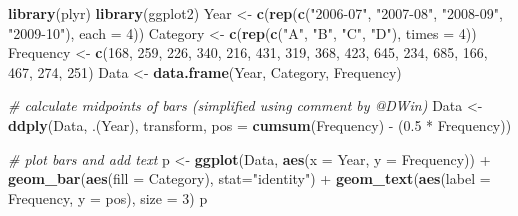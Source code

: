 \documentclass[]{book}
\newenvironment{Shaded}{\begin{snugshade}}{\end{snugshade}}
\newcommand{\KeywordTok}[1]{\textcolor[rgb]{0.13,0.29,0.53}{\textbf{{#1}}}}
\newcommand{\DataTypeTok}[1]{\textcolor[rgb]{0.13,0.29,0.53}{{#1}}}
\newcommand{\DecValTok}[1]{\textcolor[rgb]{0.00,0.00,0.81}{{#1}}}
\newcommand{\FloatTok}[1]{\textcolor[rgb]{0.00,0.00,0.81}{{#1}}}
\newcommand{\StringTok}[1]{\textcolor[rgb]{0.31,0.60,0.02}{{#1}}}
\newcommand{\CommentTok}[1]{\textcolor[rgb]{0.56,0.35,0.01}{\textit{{#1}}}}
\newcommand{\NormalTok}[1]{{#1}}
\begin{document}
\begin{Shaded}
\begin{Highlighting}[]
\KeywordTok{library}\NormalTok{(plyr)}
\KeywordTok{library}\NormalTok{(ggplot2)}
\NormalTok{Year      <-}\StringTok{ }\KeywordTok{c}\NormalTok{(}\KeywordTok{rep}\NormalTok{(}\KeywordTok{c}\NormalTok{(}\StringTok{"2006-07"}\NormalTok{, }\StringTok{"2007-08"}\NormalTok{, }\StringTok{"2008-09"}\NormalTok{, }\StringTok{"2009-10"}\NormalTok{), }\DataTypeTok{each =} \DecValTok{4}\NormalTok{))}
\NormalTok{Category  <-}\StringTok{ }\KeywordTok{c}\NormalTok{(}\KeywordTok{rep}\NormalTok{(}\KeywordTok{c}\NormalTok{(}\StringTok{"A"}\NormalTok{, }\StringTok{"B"}\NormalTok{, }\StringTok{"C"}\NormalTok{, }\StringTok{"D"}\NormalTok{), }\DataTypeTok{times =} \DecValTok{4}\NormalTok{))}
\NormalTok{Frequency <-}\StringTok{ }\KeywordTok{c}\NormalTok{(}\DecValTok{168}\NormalTok{, }\DecValTok{259}\NormalTok{, }\DecValTok{226}\NormalTok{, }\DecValTok{340}\NormalTok{, }\DecValTok{216}\NormalTok{, }\DecValTok{431}\NormalTok{, }\DecValTok{319}\NormalTok{, }\DecValTok{368}\NormalTok{, }\DecValTok{423}\NormalTok{, }\DecValTok{645}\NormalTok{, }\DecValTok{234}\NormalTok{, }\DecValTok{685}\NormalTok{, }\DecValTok{166}\NormalTok{, }\DecValTok{467}\NormalTok{, }\DecValTok{274}\NormalTok{, }\DecValTok{251}\NormalTok{)}
\NormalTok{Data      <-}\StringTok{ }\KeywordTok{data.frame}\NormalTok{(Year, Category, Frequency)}

\CommentTok{# calculate midpoints of bars (simplified using comment by @DWin)}
\NormalTok{Data <-}\StringTok{ }\KeywordTok{ddply}\NormalTok{(Data, .(Year), transform, }\DataTypeTok{pos =} \KeywordTok{cumsum}\NormalTok{(Frequency) -}\StringTok{ }\NormalTok{(}\FloatTok{0.5} \NormalTok{*}\StringTok{ }\NormalTok{Frequency))}

\CommentTok{# plot bars and add text}
\NormalTok{p <-}\StringTok{ }\KeywordTok{ggplot}\NormalTok{(Data, }\KeywordTok{aes}\NormalTok{(}\DataTypeTok{x =} \NormalTok{Year, }\DataTypeTok{y =} \NormalTok{Frequency)) +}
\StringTok{     }\KeywordTok{geom_bar}\NormalTok{(}\KeywordTok{aes}\NormalTok{(}\DataTypeTok{fill =} \NormalTok{Category), }\DataTypeTok{stat=}\StringTok{"identity"}\NormalTok{) +}
\StringTok{     }\KeywordTok{geom_text}\NormalTok{(}\KeywordTok{aes}\NormalTok{(}\DataTypeTok{label =} \NormalTok{Frequency, }\DataTypeTok{y =} \NormalTok{pos), }\DataTypeTok{size =} \DecValTok{3}\NormalTok{)}
\NormalTok{p}
\end{Highlighting}
\end{Shaded}
\end{document}
